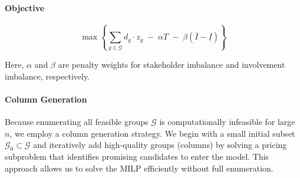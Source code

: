 \paragraph{Objective}
\begin{equation*}
\max \left\{ \sum_{g \in \mathcal{G}} d_g \cdot z_g \;-\; \alpha T \;-\; \beta (\overline{I} - \underline{I}) \right\}
\end{equation*}

Here, $\alpha$ and $\beta$ are penalty weights for stakeholder imbalance and involvement imbalance, respectively.

\paragraph{Column Generation}
Because enumerating all feasible groups $\mathcal{G}$ is computationally infeasible for large $n$, we employ a column generation strategy. We begin with a small initial subset $\mathcal{G}_0 \subset \mathcal{G}$ and iteratively add high-quality groups (columns) by solving a pricing subproblem that identifies promising candidates to enter the model. This approach allows us to solve the MILP efficiently without full enumeration.